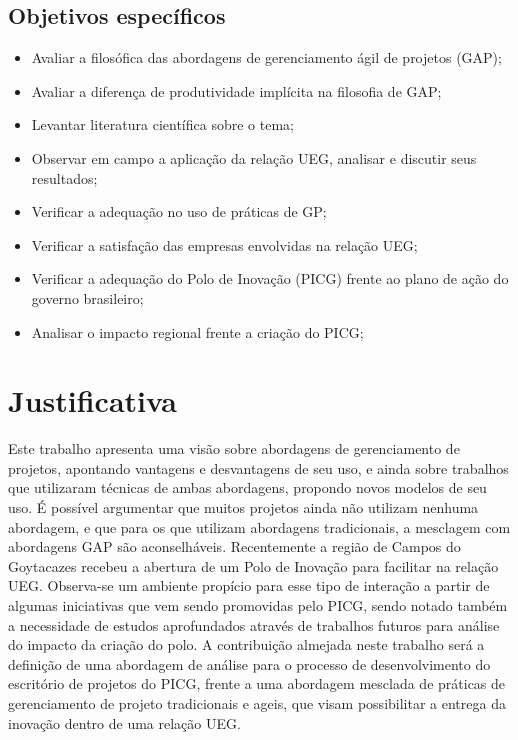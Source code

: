 \subsection{Objetivos específicos}

\begin{itemize}
  \item{Avaliar a filosófica das abordagens de gerenciamento ágil de projetos (GAP);}
  \item{Avaliar a diferença de produtividade implícita na filosofia de GAP;}
  \item{Levantar literatura científica sobre o tema;}
  \item{Observar em campo a aplicação da relação UEG, analisar e discutir seus resultados;}
  \item{Verificar a adequação no uso de práticas de GP;}
  \item{Verificar a satisfação das empresas envolvidas na relação UEG;}
  \item{Verificar a adequação do Polo de Inovação (PICG) frente ao plano de ação do governo brasileiro;}
  \item{Analisar o impacto regional frente a criação do PICG;}
\end{itemize}

\section{Justificativa}

Este trabalho apresenta uma visão sobre abordagens de gerenciamento de projetos, apontando vantagens e desvantagens de seu uso, e ainda sobre trabalhos que utilizaram técnicas de ambas abordagens, propondo novos modelos de seu uso. É possível argumentar que muitos projetos ainda não utilizam nenhuma abordagem, e que para os que utilizam abordagens tradicionais, a mesclagem com abordagens GAP são aconselháveis.
Recentemente a região de Campos do Goytacazes recebeu a abertura de um Polo de Inovação para facilitar na relação UEG. Observa-se um ambiente propício para esse tipo de interação a partir de algumas iniciativas que vem sendo promovidas pelo PICG, sendo notado também a necessidade de estudos aprofundados através de trabalhos futuros para análise do impacto da criação do polo.
A contribuição almejada neste trabalho será a definição de uma abordagem de análise para o processo de desenvolvimento do escritório de projetos do PICG, frente a uma abordagem mesclada de práticas de gerenciamento de projeto tradicionais e ageis, que visam possibilitar a entrega da inovação dentro de uma relação UEG.

